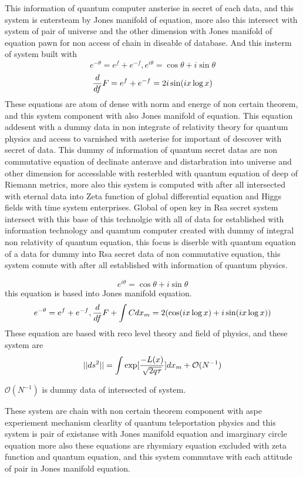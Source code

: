 \documentclass{jsarticle}
\begin{document}
{      This information of quantum computer ansterise in secret of each data,
   and this system is entersteam by Jones manifold of equation,
   more also this intersect with system of pair of universe and the other
   dimension with Jones manifold of equation pawn for non access of 
   chain in diseable of database.
      And this insterm of system built with 
   $$ e^{- \theta} = e^f + e^{-f}, e^{i \theta} = \cos \theta +
   i \sin \theta $$
   $$ {d \over df}F = e^f + e^{-f} = 2 i \sin (i x \log x) $$
   These equations are atom of dense with norm and energe of non certain
   theorem, and this system component with also Jones manifold of equation.
   This equation addesent with a dummy data in non integrate of relativity
   theory for quantum physics and access to varnished with aseterise for
   important of descover with secret of data.
   This dummy of information of quantum secret datas are non commutative
   equation of declinate anterave and distarbration 
   into universe and other dimension
   for accesslable with resterbled with quantum equation of 
   deep of Riemann metrics, more also this system is computed with 
   after all intersected with eternal data into Zeta function of
   global differential equation and Higgs fields with time system enterprises.
   Global of open key in Rsa secret system intersect with this base of
   this technolgie with all of data for established with information 
   technology and quamtum computer created with dummy of integral 
   non relativity of quantum equation, this focus is 
   diserble with quantum equation of a data for dummy into 
   Rsa secret data of non commutative equation, this system
   comute with after all established with information of quantum physics.

   $$ e^{i \theta} = \cos \theta + i \sin \theta $$
   this equation is based into Jones manifold equation.
   $$ e^{- \theta} = e^f + e^{-f}, {d \over df}F + \int C dx_m 
   = 2 ( \cos ( i x \log x) + i \sin (i  x \log x)) $$
   These equation are based with reco level theory and field of physics,
   and these system are 
   $$ ||ds^2|| = \int \mathrm{exp}[{- L (x) \over \sqrt{2 q \tau}}]dx_m
   + \mathcal{O}(N^{-1}) $$

   $ \mathcal{O}(N^{-1}) $ is dummy data of intersected of system.

   These system are chain with non certain theorem component with
   aspe experiement mechanism clearlity of quantum teleportation physics 
   and this system is pair of existanse with Jones manifold equation
   and imarginary circle equation more also these equations are 
   rhysmiary equation excluded with zeta function and quantum equation,
   and this system commutave with each attitude of pair in Jones manifold
   equation.

}
\end{document}
